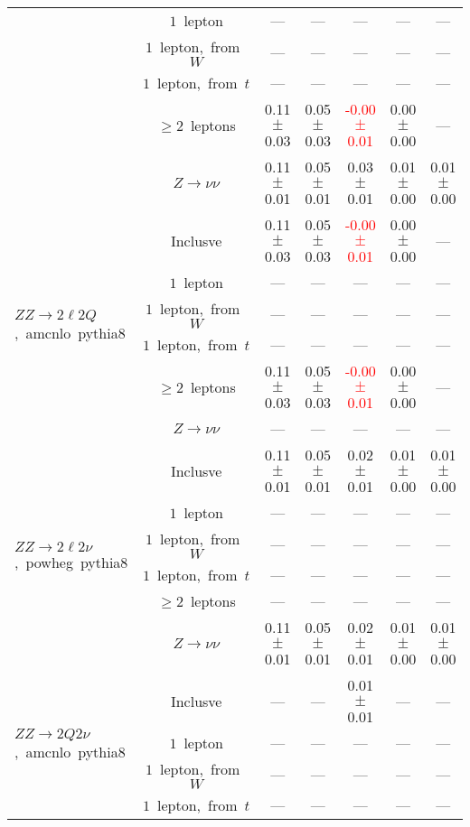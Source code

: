 \documentclass{article}
\begin{document}
\begin{longtable}{|l|c|c|c|c|c|c|}
 & $1$~lepton  & ---  & ---  & ---  & ---  & --- \\* 
 & $1$~lepton,~from~$W$  & ---  & ---  & ---  & ---  & --- \\* 
 & $1$~lepton,~from~$t$  & ---  & ---  & ---  & ---  & --- \\* 
 & $\ge2$~leptons  & 0.11 $\pm$ 0.03  & 0.05 $\pm$ 0.03  & \textcolor{red}{ -0.00 $\pm$ 0.01 }  & 0.00 $\pm$ 0.00  & --- \\* 
 & $Z\rightarrow\nu\nu$  & 0.11 $\pm$ 0.01  & 0.05 $\pm$ 0.01  & 0.03 $\pm$ 0.01  & 0.01 $\pm$ 0.00  & 0.01 $\pm$ 0.00 \\* 
\hline 
\multirow{6}{*}{$ZZ{\rightarrow}2{\ell}2Q$,~amcnlo~pythia8} & Inclusve  & 0.11 $\pm$ 0.03  & 0.05 $\pm$ 0.03  & \textcolor{red}{ -0.00 $\pm$ 0.01 }  & 0.00 $\pm$ 0.00  & --- \\* 
 & $1$~lepton  & ---  & ---  & ---  & ---  & --- \\* 
 & $1$~lepton,~from~$W$  & ---  & ---  & ---  & ---  & --- \\* 
 & $1$~lepton,~from~$t$  & ---  & ---  & ---  & ---  & --- \\* 
 & $\ge2$~leptons  & 0.11 $\pm$ 0.03  & 0.05 $\pm$ 0.03  & \textcolor{red}{ -0.00 $\pm$ 0.01 }  & 0.00 $\pm$ 0.00  & --- \\* 
 & $Z\rightarrow\nu\nu$  & ---  & ---  & ---  & ---  & --- \\* 
\hline 
\multirow{6}{*}{$ZZ{\rightarrow}2{\ell}2{\nu}$,~powheg~pythia8} & Inclusve  & 0.11 $\pm$ 0.01  & 0.05 $\pm$ 0.01  & 0.02 $\pm$ 0.01  & 0.01 $\pm$ 0.00  & 0.01 $\pm$ 0.00 \\* 
 & $1$~lepton  & ---  & ---  & ---  & ---  & --- \\* 
 & $1$~lepton,~from~$W$  & ---  & ---  & ---  & ---  & --- \\* 
 & $1$~lepton,~from~$t$  & ---  & ---  & ---  & ---  & --- \\* 
 & $\ge2$~leptons  & ---  & ---  & ---  & ---  & --- \\* 
 & $Z\rightarrow\nu\nu$  & 0.11 $\pm$ 0.01  & 0.05 $\pm$ 0.01  & 0.02 $\pm$ 0.01  & 0.01 $\pm$ 0.00  & 0.01 $\pm$ 0.00 \\* 
\hline 
\multirow{6}{*}{$ZZ{\rightarrow}2Q2{\nu}$,~amcnlo~pythia8} & Inclusve  & ---  & ---  & 0.01 $\pm$ 0.01  & ---  & --- \\* 
 & $1$~lepton  & ---  & ---  & ---  & ---  & --- \\* 
 & $1$~lepton,~from~$W$  & ---  & ---  & ---  & ---  & --- \\* 
 & $1$~lepton,~from~$t$  & ---  & ---  & ---  & ---  & --- \\* 

\end{longtable}
\end{document}
